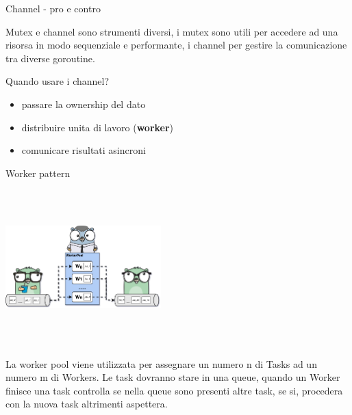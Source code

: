 \documentclass{beamer}
\begin{document}
\begin{frame}{Channel - pro e contro}
    
    \begin{center}
    Mutex e channel sono strumenti diversi, i mutex sono utili per accedere ad una risorsa in modo sequenziale e performante, i channel per gestire la comunicazione tra diverse goroutine.
    \end{center}
    
    \vspace{0.7cm}
    
    Quando usare i channel?
    \pause
    \begin{itemize}
        \item passare la ownership del dato
        \item distribuire unita di lavoro (\textbf{worker})
        \item comunicare risultati asincroni
    \end{itemize}
    
\end{frame}

\begin{frame}{Worker pattern}

\centerline{\includegraphics[width=6cm,height=6cm, keepaspectratio]{worker-pool.png}}

\vspace{1cm}

\centering La worker pool viene utilizzata per assegnare un numero n di Tasks ad un numero m di Workers. Le task dovranno stare in una queue, quando un Worker finisce una task controlla se nella queue sono presenti altre task, se si, procedera con la nuova task altrimenti aspettera. 
\end{frame}
\end{document}
